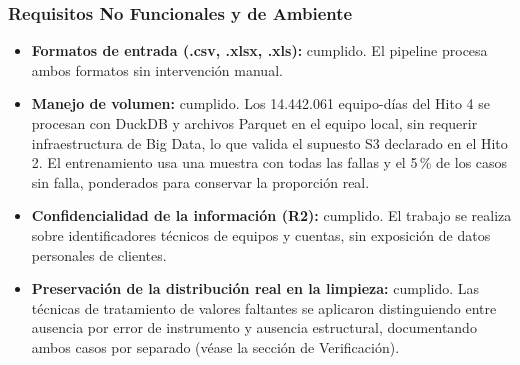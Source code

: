 \documentclass[12pt,a4paper]{article}
\begin{document}
\subsubsection*{Requisitos No Funcionales y de Ambiente}

\begin{itemize}
    \item \textbf{Formatos de entrada (.csv, .xlsx, .xls):} cumplido. El pipeline procesa ambos formatos sin intervención manual.

    \item \textbf{Manejo de volumen:} cumplido. Los 14.442.061 equipo-días del Hito 4 se procesan con DuckDB y archivos Parquet en el equipo local, sin requerir infraestructura de Big Data, lo que valida el supuesto S3 declarado en el Hito 2. El entrenamiento usa una muestra con todas las fallas y el 5\,\% de los casos sin falla, ponderados para conservar la proporción real.
 
    \item \textbf{Confidencialidad de la información (R2):} cumplido. El trabajo se realiza sobre identificadores técnicos de equipos y cuentas, sin exposición de datos personales de clientes.
 
    \item \textbf{Preservación de la distribución real en la limpieza:} cumplido. Las técnicas de tratamiento de valores faltantes se aplicaron distinguiendo entre ausencia por error de instrumento y ausencia estructural, documentando ambos casos por separado (véase la sección de Verificación).
\end{itemize}
\end{document}
